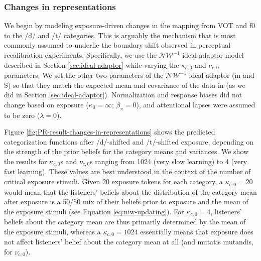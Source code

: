 \documentclass[
  11pt,
  man,floatsintext]{apa6}
\begin{document}
\subsubsection{Changes in representations}\label{changes-in-representations}

We begin by modeling exposure-driven changes in the mapping from VOT and f0 to the /d/ and /t/ categories. This is arguably the mechanism that is most commonly assumed to underlie the boundary shift observed in perceptual recalibration experiments. Specifically, we use the \(\mathcal{NW}^{-1}\) ideal adaptor model described in Section \ref{sec:ideal-adaptor} while varying the \(\kappa_{c,0}\) and \(\nu_{c,0}\) parameters. We set the other two parameters of the \(\mathcal{NW}^{-1}\) ideal adaptor (\(\mathrm{m}\) and \(\mathrm{S}\)) so that they match the expected mean and covariance of the data in \textcite{chodroff-wilson2018} (as we did in Section \ref{sec:ideal-adaptor}). Normalization and response biases did not change based on exposure (\(\kappa_0 = \infty\); \(\beta_{\pi}=0\)), and attentional lapses were assumed to be zero (\(\lambda = 0\)).

Figure \ref{fig:PR-result-changes-in-representations} shows the predicted categorization functions after /d/-shifted and /t/-shifted exposure, depending on the strength of the prior beliefs for the category means and variances. We show the results for \(\kappa_{c,0}\)s and \(\nu_{c,0}\)s ranging from 1024 (very slow learning) to 4 (very fast learning). These values are best understood in the context of the number of critical exposure stimuli. Given 20 exposure tokens for each category, a \(\kappa_{c,0}=20\) would mean that the listeners' beliefs about the distribution of the category mean after exposure is a 50/50 mix of their beliefs prior to exposure and the mean of the exposure stimuli (see Equation \eqref{eq:niw-updating}). For \(\kappa_{c,0}=4\), listeners' beliefs about the category mean are thus primarily determined by the mean of the exposure stimuli, whereas a \(\kappa_{c,0}=1024\) essentially means that exposure does not affect listeners' belief about the category mean at all (and mutatis mutandis, for \(\nu_{c,0}\)).
\end{document}

